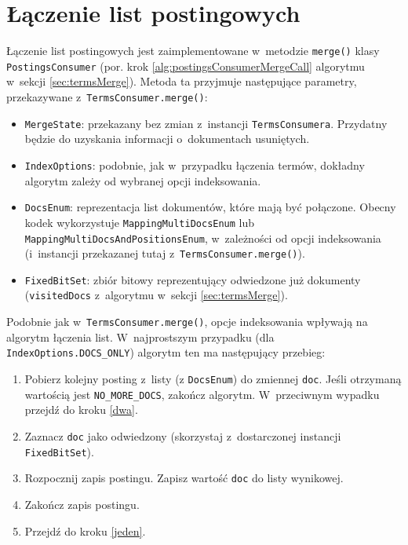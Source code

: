 \section{Łączenie list postingowych}

Łączenie list postingowych jest zaimplementowane w~metodzie \texttt{merge()} klasy \texttt{PostingsConsumer} (por. krok \ref{alg:postingsConsumerMergeCall} algorytmu w~sekcji \ref{sec:termsMerge}). Metoda ta przyjmuje następujące parametry, przekazywane z~\texttt{TermsConsumer.merge()}:
\begin{itemize}
 \item \texttt{MergeState}: przekazany bez zmian z~instancji \texttt{TermsConsumera}. Przydatny będzie do uzyskania informacji o~dokumentach usuniętych.
 \item \texttt{IndexOptions}: podobnie, jak w~przypadku łączenia termów, dokładny algorytm zależy od wybranej opcji indeksowania.
 \item \texttt{DocsEnum}: reprezentacja list dokumentów, które mają być połączone. Obecny kodek wykorzystuje \texttt{MappingMultiDocsEnum} lub \\ \texttt{MappingMultiDocsAndPositionsEnum}, w~zależności od opcji indeksowania (i~instancji przekazanej tutaj z~\texttt{TermsConsumer.merge()}). 
 \item \texttt{FixedBitSet}: zbiór bitowy reprezentujący odwiedzone już dokumenty (\texttt{visitedDocs} z~algorytmu w~sekcji \ref{sec:termsMerge}).
\end{itemize}

Podobnie jak w~\texttt{TermsConsumer.merge()}, opcje indeksowania wpływają na algorytm łączenia list. W~najprostszym przypadku (dla \texttt{IndexOptions.DOCS\_ONLY}) algorytm ten ma następujący przebieg:
\begin{enumerate}
 \item \label{jeden} Pobierz kolejny posting z~listy (z \texttt{DocsEnum}) do zmiennej \texttt{doc}. Jeśli otrzymaną wartością jest \texttt{NO\_MORE\_DOCS}, zakończ algorytm. W~przeciwnym wypadku przejdź do kroku \ref{dwa}.
 \item \label{dwa} Zaznacz \texttt{doc} jako odwiedzony (skorzystaj z~dostarczonej instancji \texttt{FixedBitSet}).
 \item \label{trzy} Rozpocznij zapis postingu. Zapisz wartość \texttt{doc} do listy wynikowej.
 \item Zakończ zapis postingu.
 \item Przejdź do kroku \ref{jeden}.
\end{enumerate}

